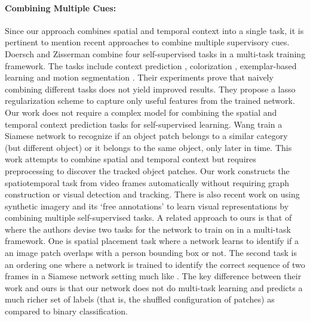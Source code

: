 \documentclass[10pt,twocolumn,letterpaper]{article}
\begin{document}
\paragraph{\textbf{Combining Multiple Cues:}}
Since our approach combines spatial and temporal context into a single task, it is pertinent to mention recent approaches to combine multiple supervisory cues. Doersch and Zisserman \cite{doersch2017multi} combine four self-supervised tasks in a multi-task training framework. The tasks include context prediction \cite{doersch2015unsupervised}, colorization \cite{zhang2016colorful}, exemplar-based learning \cite{dosovitskiy2014discriminative} and motion segmentation \cite{pathak2017learning}. Their experiments prove that naively combining different tasks does not yield improved results. They propose a lasso regularization scheme to capture only useful features from the trained network. Our work does not require a complex model for combining the spatial and temporal context prediction tasks for self-supervised learning. Wang \etal \cite{wang2017transitive} train a Siamese network to recognize if an object patch belongs to a similar category (but different object) or it belongs to the same object, only later in time. This work attempts to combine spatial and temporal context but requires preprocessing to discover the tracked object patches. Our work constructs the spatiotemporal task from video frames automatically without requiring graph construction or visual detection and tracking. There is also recent work on using synthetic imagery and its `free annotations' to learn visual representations \cite{ren2017cross} by combining multiple self-supervised tasks. A related approach to ours is that of \cite{sumer2017self} where the authors devise two tasks for the network to train on in a multi-task framework. One is spatial placement task where a network learns to identify if a an image patch overlaps with a person bounding box or not. The second task is an ordering one where a network is trained to identify the correct sequence of two frames in a Siamese network setting much like \cite{misra2016shuffle}. The key difference between their work and ours is that our network does not do multi-task learning and predicts a much richer set of labels (that is, the shuffled configuration of patches) as compared to binary classification. 


\end{document}
